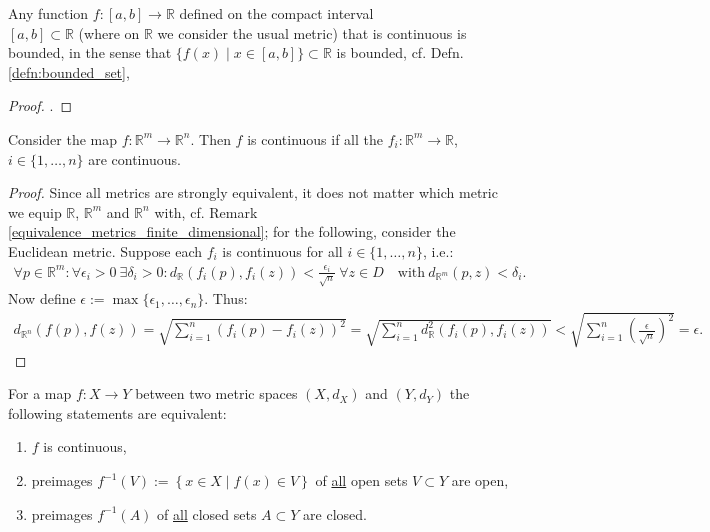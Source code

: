 \begin{theorem}\label{thrm:continuous_functions_bounded_on_compact_interval}
	Any function $f: [a, b]\to\mathbb R$ defined on the compact interval \\ $[a, b] \subset \mathbb R$ (where on $\mathbb R$ we consider the usual metric) that is continuous is bounded, in the sense that $\{ f(x) \mid x\in [a, b] \} \subset \mathbb R$ is bounded, cf. Defn. \ref{defn:bounded_set}, 
\end{theorem}

\begin{proof}
	\cite[p. 161]{MfPI}.
\end{proof}

\begin{lemma}\label{continuity_vector_components}
	Consider the map $f: \mathbb R^m\rightarrow\mathbb R^n$. Then $f$ is continuous if all the $f_i: \mathbb R^m\rightarrow\mathbb R$, $i\in\{1, \dots, n\}$ are continuous. 
\end{lemma}
\begin{proof}
	Since all metrics are strongly equivalent, it does not matter which metric we equip $\mathbb R$, $\mathbb R^m$ and $\mathbb R^n$ with, cf. Remark \ref{equivalence_metrics_finite_dimensional}; for the following, consider the Euclidean metric. Suppose each $f_i$ is continuous for all $i\in \{1, \dots, n\}$, i.e.: 
	\begin{align} 
		\forall p\in\mathbb R^m: \forall \epsilon_i > 0 \ \exists 
		\delta_i>0: d_{\mathbb R}(f_i(p), f_i(z)) < \frac{\epsilon_i}{\sqrt{n}} \ \forall z\in D \quad \text{with}\ d_{\mathbb R^m}(p, z) < \delta_i. 
	\end{align} 
	Now define $\epsilon:= \max\{\epsilon_1, \dots, \epsilon_n\}$. Thus: 
	\begin{align}
		d_{\mathbb R^n}(f(p), f(z)) = \sqrt{\sum_{i=1}^{n}\left(f_i(p)-f_i(z)\right)^2} 
		= \sqrt{\sum_{i=1}^{n}d^2_{\mathbb R}\left(f_i(p), f_i(z)\right)} < \sqrt{\sum_{i=1}^{n}\left(\frac{\epsilon}{\sqrt{n}}\right)^2} = \epsilon. 
	\end{align}
\end{proof}

\begin{theorem}\label{thrm:preimages_continuous_functions}
	For a map $f: X\rightarrow Y$ between two metric spaces $\left(X, d_{X} \right)$ and $\left(Y, d_{Y} \right)$ the following statements are equivalent: 
	\begin{enumerate}[label = (\roman*)]
		\item $f$ is continuous,
		\item preimages $f^{-1}(V) := \left\{ x\in X\mid f\left(x\right) \in V \right\}$ of \underline{all} open sets $V\subset Y$ are open,  
		\item preimages $f^{-1}(A)$ of \underline{all} closed sets $A\subset Y$ are closed. 	
	\end{enumerate}
\end{theorem}

